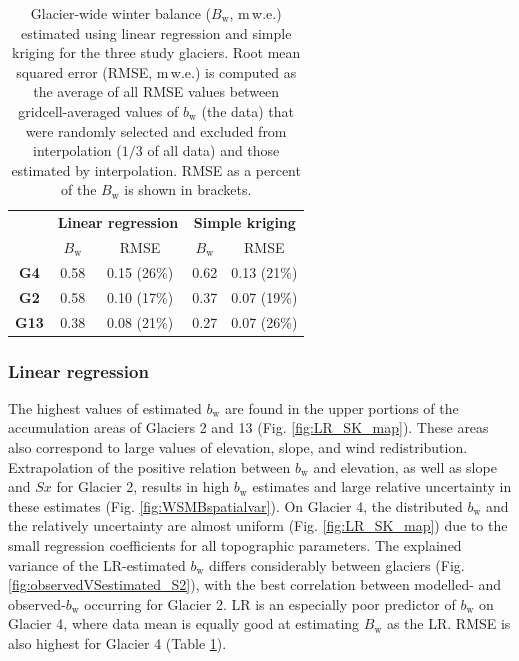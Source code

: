 \documentclass[twocolumn, letterpaper]{igs}
\begin{document}
\begin{table}[]
\centering
\caption{Glacier-wide winter balance ($B_\mathrm{w}$, m\,w.e.) estimated using linear regression and simple kriging for the three study glaciers. Root mean squared error (RMSE, m\,w.e.) is computed as the average of all RMSE values between gridcell-averaged values of $b_\mathrm{w}$ (the data) that were randomly selected and excluded from interpolation ($1/3$ of all data) and those estimated by interpolation. RMSE as a percent of the $B_\mathrm{w}$ is shown in brackets.}
\label{tab:WSMB&RMSE}
\begin{tabular}{c|cc|cc}
 & \multicolumn{2}{c|}{\textbf{Linear regression}} & \multicolumn{2}{c}{\textbf{Simple kriging}} \\
 & $B_\mathrm{w}$ & RMSE & $B_\mathrm{w}$ & RMSE \\ \hline
\textbf{G4} & 0.58 & 0.15 (26\%) & 0.62 & 0.13 (21\%) \\
\textbf{G2} & 0.58 & 0.10 (17\%) & 0.37 & 0.07 (19\%) \\
\textbf{G13} & 0.38 & 0.08 (21\%) & 0.27 & 0.07 (26\%)
\end{tabular}
\end{table}

\subsubsection{Linear regression}

The highest values of estimated $b_\mathrm{w}$ are found in the upper portions of the accumulation areas of Glaciers 2 and 13 (Fig. \ref{fig:LR_SK_map}). These areas also correspond to large values of elevation, slope, and wind redistribution. Extrapolation of the positive relation between $b_\mathrm{w}$ and elevation, as well as slope and $Sx$ for Glacier 2, results in high $b_\mathrm{w}$ estimates and large relative uncertainty in these estimates (Fig. \ref{fig:WSMBspatialvar}). On Glacier 4, the distributed $b_\mathrm{w}$ and the relatively uncertainty are almost uniform (Fig. \ref{fig:LR_SK_map}) due to the small regression coefficients for all topographic parameters. The explained variance of the LR-estimated $b_\mathrm{w}$ differs considerably between glaciers (Fig. \ref{fig:observedVSestimated_S2}), with the best correlation between modelled- and observed-$b_\mathrm{w}$ occurring for Glacier 2. LR is an especially poor predictor of $b_\mathrm{w}$ on Glacier 4, where data mean is equally good at estimating $B_\mathrm{w}$ as the LR. RMSE is also highest for Glacier 4 (Table \ref{tab:WSMB&RMSE}). 
\end{document}

